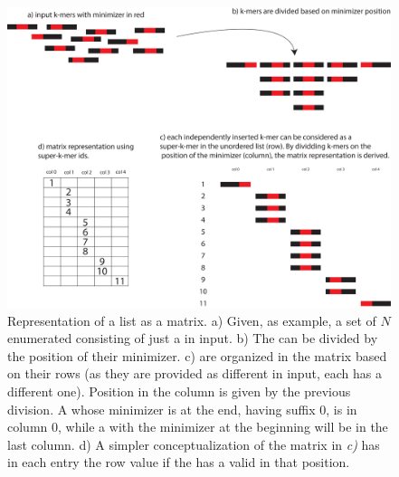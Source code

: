 \begin{figure}[h!]
	\centering
	\includegraphics[width=\textwidth]{figures/kmer_methods/skmer_export.pdf}
	\caption[Representation of a \skmer list as a matrix.]{Representation of a \skmer list as a matrix. a) Given, as example, a set of $N$ enumerated \skmers consisting of just a \kmer in input. b) The \kmers can be divided by the position of their minimizer. c) \kmers are organized in the matrix based on their rows (as they are provided as different \skmers in input, each \kmer has a different one). Position in the column is given by the previous division. A \kmer whose minimizer is at the end, having suffix 0, is in column 0, while a \kmer with the minimizer at the beginning will be in the last column. d) A simpler conceptualization of the matrix in \emph{c)} has in each entry the row value if the \skmer has a valid \kmer in that position.}
	\label{fig:matrix}
\end{figure}


